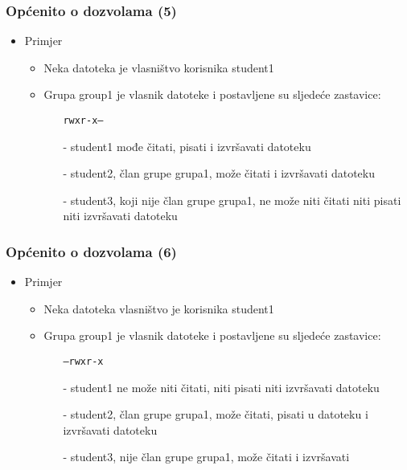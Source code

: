 \documentclass[table,usenames,dvipsnames]{beamer}
\newcommand{\shell}[1]{\texttt{#1}}
\begin{document}
\begin{frame}[t]
\frametitle{Općenito o dozvolama (5)}
\begin{itemize}
  \item Primjer
  \begin{itemize}
    \item Neka datoteka je vlasništvo korisnika student1
    \item Grupa group1 je vlasnik datoteke i postavljene su sljedeće 
          zastavice:
    \begin{itemize}
      \item[] \shell{rwxr-x---}
      \item[-] student1 mođe čitati, pisati i izvršavati datoteku 
      \item[-] student2, član grupe grupa1, može čitati i izvršavati 
               datoteku
      \item[-] student3, koji nije član grupe grupa1, ne može niti čitati 
               niti pisati niti izvršavati datoteku
    \end{itemize}
  \end{itemize}
\end{itemize}
\end{frame}

\begin{frame}[t]
\frametitle{Općenito o dozvolama (6)}
\begin{itemize}
  \item Primjer
  \begin{itemize}
    \item Neka datoteka vlasništvo je korisnika student1
    \item Grupa group1 je vlasnik datoteke i postavljene su sljedeće 
          zastavice:
    \begin{itemize}
      \item[] \shell{---rwxr-x}
      \item[-] student1 ne može niti čitati, niti pisati niti izvršavati 
               datoteku
      \item[-] student2, član grupe grupa1, može čitati, pisati u datoteku
               i izvršavati datoteku
      \item[-] student3, nije član grupe grupa1, može čitati i izvršavati
    \end{itemize}
  \end{itemize}
\end{itemize}
\end{frame}
\end{document}
